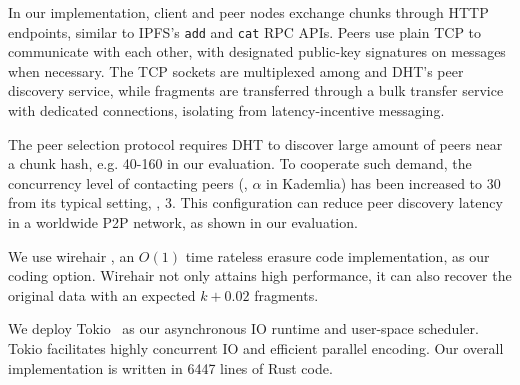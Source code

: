 In our implementation, client and peer nodes exchange chunks through HTTP endpoints, similar to IPFS's \texttt{add} and \texttt{cat} RPC APIs.
Peers use plain TCP to communicate with each other, with designated public-key signatures on messages when necessary.
The TCP sockets are multiplexed among \sys and DHT's peer discovery service, while fragments are transferred through a bulk transfer service with dedicated connections, isolating from latency-incentive messaging.

The peer selection protocol requires DHT to discover large amount of peers near a chunk hash, e.g. 40-160 in our evaluation.
To cooperate such demand, the concurrency level of contacting peers (\ie, $\alpha$ in Kademlia) has been increased to 30 from its typical setting, \ie, 3.
This configuration can reduce peer discovery latency in a worldwide P2P network, as shown in our evaluation.

We use wirehair \cite{wirehair}, an $O(1)$ time rateless erasure code implementation, as our coding option.
Wirehair not only attains high performance, it can also recover the original data with an expected $k + 0.02$ fragments.

We deploy Tokio~\cite{tokio} as our asynchronous IO runtime and user-space scheduler.
Tokio facilitates highly concurrent IO and efficient parallel encoding.
Our overall implementation is written in 6447 lines of Rust code.



